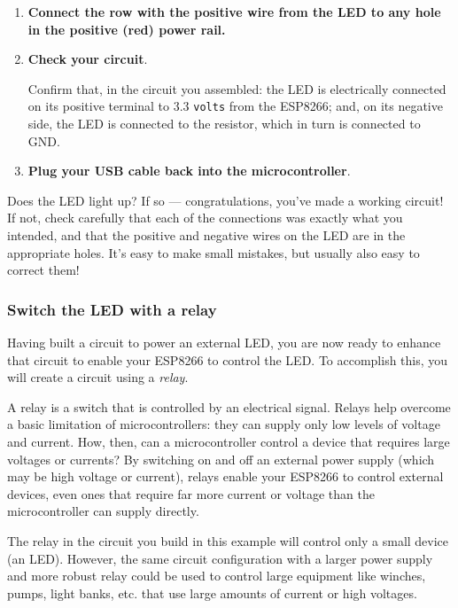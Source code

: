 \begin{enumerate}
	\item \textbf{Connect the row with the positive wire from the LED to any hole in the positive (red) power rail.}
	
	\item \textbf{Check your circuit}.
	
	Confirm that, in the circuit you assembled: the LED is electrically connected on its positive terminal to 3.3 \texttt{volts} from the ESP8266; and, on its negative side, the LED is connected to the resistor, which in turn is connected to GND.
	
	\item \textbf{Plug your USB cable back into the microcontroller}.
\end{enumerate}
Does the LED light up? If so --- congratulations, you’ve made a working circuit! 
If not, check carefully that each of the connections was exactly what you intended, and that the positive and negative wires on the LED are in the appropriate holes. 
It’s easy to make small mistakes, but usually also easy to correct them!


\subsubsection{\howto Switch the LED with a relay}

Having built a circuit to power an external LED, you are now ready to enhance that circuit to enable your ESP8266 to control the LED.
To accomplish this, you will create a circuit using a \emph{relay}.

A relay is a switch that is controlled by an electrical signal. 
Relays help overcome a basic limitation of microcontrollers: they can supply only low levels of voltage and current. 
How, then, can a microcontroller control a device that requires large voltages or currents?
By switching on and off an external power supply (which may be high voltage or current), relays enable your ESP8266 to control external devices, even ones that require far more current or voltage than the microcontroller can supply directly.

The relay in the circuit you build in this example will control only a small device (an LED).
However, the same circuit configuration with a larger power supply and more robust relay could be used to control large equipment like winches, pumps, light banks, etc. that use large amounts of current or high voltages. 


